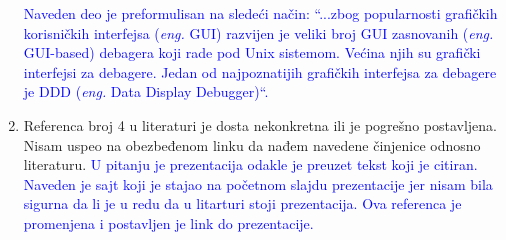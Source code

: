 \documentclass[a4paper]{report}
\newcommand{\odgovor}[1]{\textcolor{blue}{#1}}
\begin{document}
\begin{enumerate}
	\odgovor{Naveden deo je preformulisan na sledeći način:  ``...zbog popularnosti grafičkih korisničkih interfejsa
(\textit{eng.} GUI) razvijen je veliki broj GUI zasnovanih (\textit{eng.} GUI-based) debagera koji rade pod Unix sistemom. Većina njih su grafički interfejsi za debagere. Jedan od najpoznatijih grafičkih interfejsa za debagere je DDD (\textit{eng.} Data Display Debugger)``.} 
	\item Referenca broj 4 u literaturi je dosta nekonkretna ili je pogrešno postavljena. Nisam uspeo na obezbeđenom linku da nađem navedene činjenice odnosno literaturu.
    \odgovor{U pitanju je prezentacija odakle je preuzet tekst koji je citiran. Naveden je sajt koji je stajao na početnom slajdu prezentacije 
jer nisam bila sigurna da li je u redu da u litarturi stoji prezentacija. Ova referenca je promenjena i postavljen je link do prezentacije.}

 
\end{enumerate}
\end{document}
